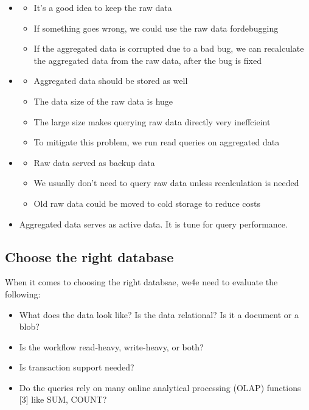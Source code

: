 \documentclass{report}
\theoremstyle{definition}
\let\oldsubsection\subsection
\renewcommand{\subsection}{\oldsubsection*}
\begin{document}
\begin{itemize}
\item

\begin{itemize}
\item
It's a good idea to keep the raw data
\item
If something goes wrong, we could use the raw data fordebugging
\item
If the aggregated data is corrupted due to a bad bug, we can recalculate the aggregated data from the raw data, after the bug is fixed
\end{itemize}

\item
\begin{itemize}
\item
Aggregated data should be stored as well
\item
The data size of the raw data is huge
\item
The large size makes querying raw data directly very ineffcieint
\item
To mitigate this problem, we run read queries on aggregated data
\end{itemize}

\item
\begin{itemize}
\item
Raw data served as backup data
\item
We usually don't need to query raw data unless recalculation is needed
\item
Old raw data could be moved to cold storage to reduce costs
\end{itemize}
\item
Aggregated data serves as active data. It is tune for query performance.
\end{itemize}

\subsection{Choose the right database}

When it comes to choosing the right databsae, we4e need to evaluate the following:

\begin{itemize}
\item
What does the data look like? Is the data relational? Is it a document or a blob?
\item
Is the workflow read-heavy, write-heavy, or both?
\item
Is transaction support needed?
\item
Do the queries rely on many online analytical processing (OLAP) functions [3] like SUM, COUNT?
\end{itemize}
\end{document}
